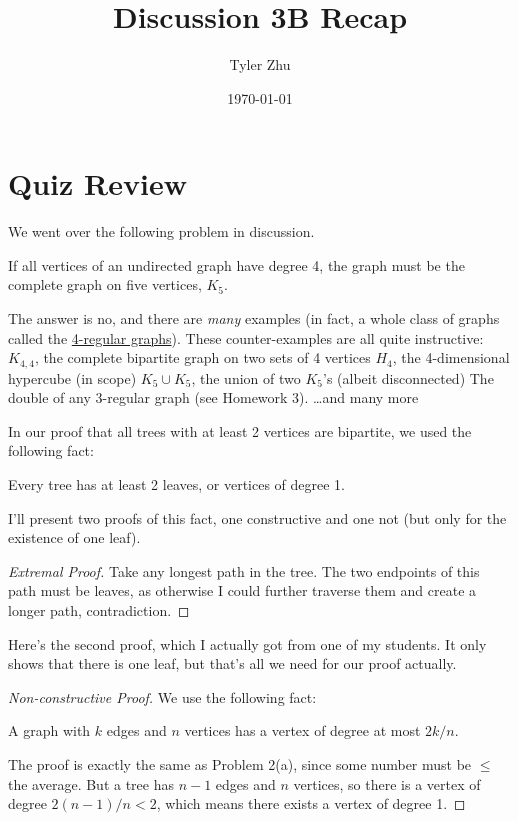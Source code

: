 \documentclass[11 pt]{scrartcl}
\newcommand{\hwtitle}{Discussion 3B Recap}
\begin{document}
 
\title{\Large \hwtitle{}}
\author{\large Tyler Zhu}
\date{\large\today}

\maketitle 

\section{Quiz Review}
We went over the following problem in discussion. 
\begin{problem}
    If all vertices of an undirected graph have degree 4, the graph must be the complete graph on five vertices, $K_5$. 
\end{problem}
The answer is no, and there are \emph{many} examples (in fact, a whole class of graphs called the \href{https://en.wikipedia.org/wiki/Regular_graph}{4-regular graphs}). These counter-examples are all quite instructive: 
\itemnum
    \ii $K_{4,4}$, the complete bipartite graph on two sets of 4 vertices
    \ii $H_4$, the 4-dimensional hypercube (in scope) 
    \ii $K_5\cup K_5$, the union of two $K_5$'s (albeit disconnected) 
    \ii The double of any 3-regular graph (see Homework 3).  
    \ii \dots and many more
\itemend

In our proof that all trees with at least 2 vertices are bipartite, we used the following fact:
\begin{fact}
    Every tree has at least 2 leaves, or vertices of degree 1. 
\end{fact}
I'll present two proofs of this fact, one constructive and one not (but only for the existence of one leaf). 
\begin{proof}[Extremal Proof]
    Take any longest path in the tree. The two endpoints of this path must be leaves, as otherwise I could further traverse them and create a longer path, contradiction.
\end{proof}

Here's the second proof, which I actually got from one of my students. It only shows that there is one leaf, but that's all we need for our proof actually.  

\begin{proof}[Non-constructive Proof]
    We use the following fact: 
    \begin{fact}
        A graph with $k$ edges and $n$ vertices has a vertex of degree at most $2k/n$.
    \end{fact}
    The proof is exactly the same as Problem 2(a), since some number must be $\leq$ the average. But a tree has $n-1$ edges and $n$ vertices, so there is a vertex of degree $2(n-1)/n < 2$, which means there exists a vertex of degree 1. 
\end{proof}
\end{document}

